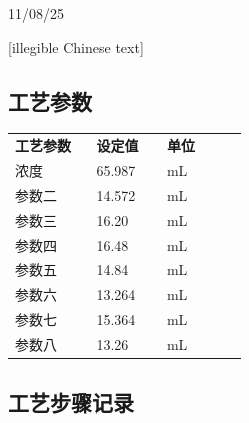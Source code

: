 \documentclass[UTF8,10pt,a4paper,fontset=fandol]{ctexart}
\newcommand{\fieldvalue}[1]{#1}
\newcommand{\handwritten}[1]{#1}
\begin{document}
\vspace{1em}

\fieldvalue{\handwritten{11/08/25}}

\fieldvalue{\handwritten{[illegible Chinese text]}}

\subsection*{工艺参数}

\begin{tabular}{@{}p{0.30\linewidth}p{0.26\linewidth}p{0.30\linewidth}@{}}
\textbf{工艺参数} & \textbf{设定值} & \textbf{单位} \\
浓度 & 
\fieldvalue{65.987} & mL \\
参数二 &
\fieldvalue{14.572} & mL \\
参数三 &
\fieldvalue{16.20} & mL \\
参数四 &
\fieldvalue{16.48} & mL \\
参数五 &
\fieldvalue{14.84} & mL \\
参数六 &
\fieldvalue{13.264} & mL \\
参数七 &
\fieldvalue{15.364} & mL \\
参数八 &
\fieldvalue{13.26} & mL
\end{tabular}

\subsection*{工艺步骤记录}
\end{document}
